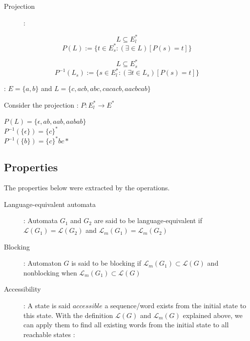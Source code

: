 \begin{description}
\item [Projection] : 
\end{description}

\begin{equation*}
L \subseteq E_l^*
\end{equation*}
\begin{equation*}
P(L) :=\{ t \in E_s^* : (\exists \in L) [P(s)=t] \}
\end{equation*}

\begin{equation*}
L \subseteq E_s^*
\end{equation*}
\begin{equation*}
P^{-1}(L_s) := \{ s \in E_l^* : (\exists t \in L_s) [P(s)=t] \}
\end{equation*}

\begin{description}
\item [Example of operations for Languages] : $E=\{a,b\}$ and $L =\{c, acb, abc, cacacb, aacbcab\}$
\item\hspace{6.6cm} Consider the projection : $ P: E_l^* \rightarrow E^*$\\
\end{description}

\begin{center}
$P(L) = \{ \epsilon, ab, aab, aabab\}$ \\
$P^{-1}(\{\epsilon\}) = \{c\}^*$\\
$P^{-1}(\{b\}) = \{c\}^*{b}{c}*$
\end{center}



\subsection{Properties}
The properties below were extracted by the operations.
\begin{description}
\item [Language-equivalent automata \cite{cassandras2009introduction} ] : Automata $G_1$ and $G_2$ are said to be language-equivalent if
$\mathcal{L}(G_1) = \mathcal{L}(G_2)$ and $\mathcal{L}_m(G_1) = \mathcal{L}_m(G_2)$ \\

\item [Blocking] : Automaton $G$ is said to be blocking if $ \mathcal{L}_m(G_1) \subset\mathcal{L}(G) $
and nonblocking when $ \mathcal{L}_m(G_1) \subset \mathcal{L}(G) $

\item [Accessibility] : A state is said $accessible$ a sequence/word exists from the initial state to this state. With the definition $\mathcal{L}(G)$ and $\mathcal{L}_m(G)$ explained above, we can apply them to find all existing words from the initial state to all reachable states :
\end{description}



